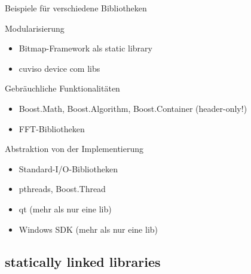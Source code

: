 \begin{frame}{Beispiele für verschiedene Bibliotheken}
	\begin{block}{Modularisierung}
		\begin{itemize}
			\item Bitmap-Framework als static library
			\item cuviso device com libs
		\end{itemize}
	\end{block}
	
	\pause
	\vspace{0.5em}
	
	\begin{block}{Gebräuchliche Funktionalitäten}
		\begin{itemize}
			\item Boost.Math, Boost.Algorithm, Boost.Container (header-only!)
			\item FFT-Bibliotheken
		\end{itemize}
	\end{block}
	
	\pause
	\vspace{0.5em}
	
	\begin{block}{Abstraktion von der Implementierung}
		\begin{itemize}
			\item Standard-I/O-Bibliotheken
			\item pthreads, Boost.Thread
			\item qt (mehr als nur eine lib)
			\item Windows SDK (mehr als nur eine lib)
		\end{itemize}
	\end{block}
\end{frame}


\subsection{statically linked libraries}

